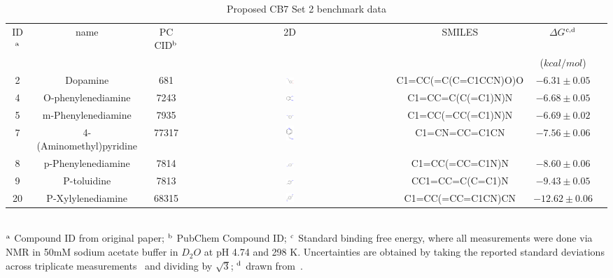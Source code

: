 \documentclass[aps,pre,twocolumn,nofootinbib,superscriptaddress,10pt, final,tightenlines]{revtex4-1}
\begin{document}
\begingroup
\squeezetable
\begin{table}
\caption{Proposed CB7 Set 2 benchmark data}
\label{cb7_benchmark2}
\begin{tabular}{@{}| c | c | c | c | c | c | c@{}}
\hline
ID$^{\rm a}$ & name & PC CID$^{\rm b}$   & 2D    & SMILES &  $\Delta G$$^{\rm c, d}$ \\\
               &           &                   &                &          & ($kcal/mol$)                \\\hline

2 &	Dopamine	 & 681 & \includegraphics[width=0.04\textwidth]{figures/681.pdf} &	C1=CC(=C(C=C1CCN)O)O & $-6.31 \pm 0.05$ \\
4 &	O-phenylenediamine	 & 7243 & 	\includegraphics[width=0.04\textwidth]{figures/7243.pdf} & C1=CC=C(C(=C1)N)N & $-6.68 \pm 0.05$\\
5 &	m-Phenylenediamine & 	7935	 & \includegraphics[width=0.04\textwidth]{figures/7935.pdf} & C1=CC(=CC(=C1)N)N &  $-6.69 \pm 0.02$\\
7 &	4-(Aminomethyl)pyridine & 	77317 & \includegraphics[width=0.04\textwidth]{figures/77317.pdf} & 	C1=CN=CC=C1CN & $-7.56 \pm 0.06 $ \\
8 &	p-Phenylenediamine	& 7814 & 	\includegraphics[width=0.04\textwidth]{figures/7814.pdf} & C1=CC(=CC=C1N)N & $-8.60 \pm 0.06 $ \\
9 &	P-toluidine & 	7813	 & \includegraphics[width=0.04\textwidth]{figures/7813.pdf} & CC1=CC=C(C=C1)N & $-9.43 \pm 0.05 $ \\
20 &	P-Xylylenediamine & 	68315 & 	\includegraphics[width=0.04\textwidth]{figures/68315.pdf} & C1=CC(=CC=C1CN)CN &  $-12.62 \pm 0.06$ \\


\hline
\end{tabular}\\
$^{\rm a}$ Compound ID from original paper; $^{\rm b}$ PubChem Compound ID; $^{\rm c}$ Standard binding free energy, where all measurements were done via NMR in 50mM sodium acetate buffer in $D_2O$ at pH 4.74 and 298 K. Uncertainties are obtained by taking the reported standard deviations across triplicate measurements~\cite{isaacs_personal_2016} and dividing by $\sqrt 3$;  $^{\rm d}$ drawn from~\cite{liu_cucurbituril_2005}.
\end{table}
\endgroup
\end{document}
